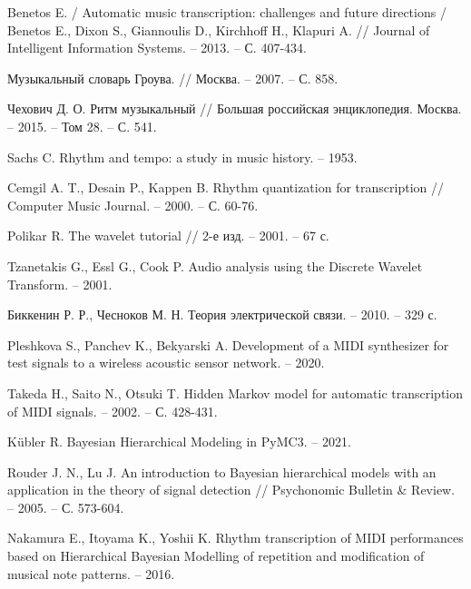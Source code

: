 
\begingroup
\renewcommand{\section}[2]{}
\begin{thebibliography}{}
	
Benetos E. / Automatic music transcription: challenges and future directions / Benetos E., Dixon S., Giannoulis D., Kirchhoff H., Klapuri A. // Journal of Intelligent Information Systems. -- 2013. -- С. 407-434.

Музыкальный словарь Гроува. // Москва. -- 2007. -- С. 858.

Чехович Д. О. Ритм музыкальный // Большая российская энциклопедия. Москва. -- 2015. -- Том 28. -- С. 541.

Sachs C. Rhythm and tempo: a study in music history. -- 1953.

Cemgil A. T., Desain P., Kappen B. Rhythm quantization for transcription // Computer Music Journal. -- 2000. -- С. 60-76.

Polikar R. The wavelet tutorial // 2-е изд. -- 2001. -- 67 с.

Tzanetakis G., Essl G., Cook P. Audio analysis using the Discrete Wavelet Transform. -- 2001.

Биккенин Р. Р., Чесноков М. Н. Теория электрической связи. -- 2010. -- 329 с.

Pleshkova S., Panchev K., Bekyarski A. Development of a MIDI synthesizer for test signals to a wireless acoustic sensor network. -- 2020.

Takeda H., Saito N., Otsuki T. Hidden Markov model for automatic transcription of MIDI signals. -- 2002. -- С. 428-431.

Kübler R. Bayesian Hierarchical Modeling in PyMC3. -- 2021.

Rouder J. N., Lu J. An introduction to Bayesian hierarchical models with an application in the theory of signal detection // Psychonomic Bulletin \& Review. -- 2005. -- С. 573-604.

Nakamura E., Itoyama K., Yoshii K. Rhythm transcription of MIDI performances based on Hierarchical Bayesian Modelling of repetition and modification of musical note patterns. -- 2016.


\end{thebibliography}

